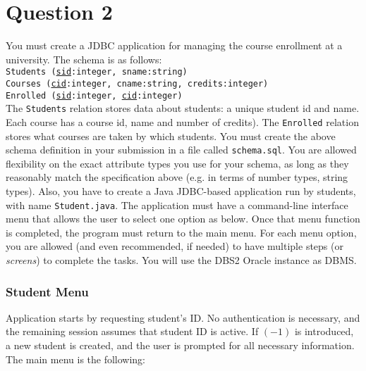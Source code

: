
\section*{Question 2}

You must create a JDBC application for managing the course enrollment at a university. The schema is as follows:\\

\texttt{Students (\underline{sid}:integer, sname:string)}\\
\texttt{Courses (\underline{cid}:integer, cname:string, credits:integer)}\\
\texttt{Enrolled (\underline{sid}:integer, \underline{cid}:integer)}\\

The \texttt{Students} relation stores data about students: a unique student id and name.
Each course has a course id, name and number of credits).
The \texttt{Enrolled} relation stores what courses are taken by which students.
You must create the above schema definition in your submission in a file called \texttt{schema.sql}.
You are allowed flexibility on the exact attribute types you use for your schema, as long as they reasonably match the specification above (e.g. in terms of number types, string types).
Also, you have to create a Java JDBC-based application run by students, with name \texttt{Student.java}.
The application must have a command-line interface menu that allows the user to select one option as below.
Once that menu function is completed, the program must return to the main menu.
For each menu option, you are allowed (and even recommended, if needed) to have multiple steps (or \textit{screens}) to complete the tasks.
You will use the DBS2 Oracle instance as DBMS.

\subsubsection*{Student Menu}

Application starts by requesting student's ID. No authentication is necessary, and the remaining session 
assumes that student ID is active.
If $(-1)$ is  introduced, a new student is created, and the user is prompted for all necessary information. The main menu is the following:

